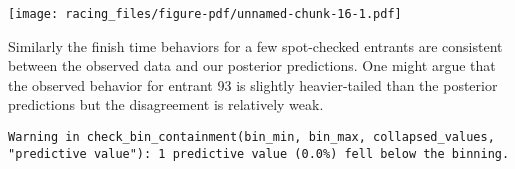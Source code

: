 \documentclass[
  letterpaper,
  DIV=11,
  numbers=noendperiod]{scrartcl}
\newenvironment{Shaded}{\begin{snugshade}}{\end{snugshade}}
\newcommand{\AttributeTok}[1]{\textcolor[rgb]{0.40,0.45,0.13}{#1}}
\newcommand{\ControlFlowTok}[1]{\textcolor[rgb]{0.00,0.23,0.31}{#1}}
\newcommand{\DecValTok}[1]{\textcolor[rgb]{0.68,0.00,0.00}{#1}}
\newcommand{\FunctionTok}[1]{\textcolor[rgb]{0.28,0.35,0.67}{#1}}
\newcommand{\NormalTok}[1]{\textcolor[rgb]{0.00,0.23,0.31}{#1}}
\newcommand{\OtherTok}[1]{\textcolor[rgb]{0.00,0.23,0.31}{#1}}
\newcommand{\SpecialCharTok}[1]{\textcolor[rgb]{0.37,0.37,0.37}{#1}}
\newcommand{\StringTok}[1]{\textcolor[rgb]{0.13,0.47,0.30}{#1}}
\begin{document}
\texttt{[image: racing\_files/figure-pdf/unnamed-chunk-16-1.pdf]}

Similarly the finish time behaviors for a few spot-checked entrants are
consistent between the observed data and our posterior predictions. One
might argue that the observed behavior for entrant 93 is slightly
heavier-tailed than the posterior predictions but the disagreement is
relatively weak.

\begin{Shaded}
\end{Shaded}

\begin{verbatim}
Warning in check_bin_containment(bin_min, bin_max, collapsed_values,
"predictive value"): 1 predictive value (0.0%) fell below the binning.
\end{verbatim}
\end{document}
